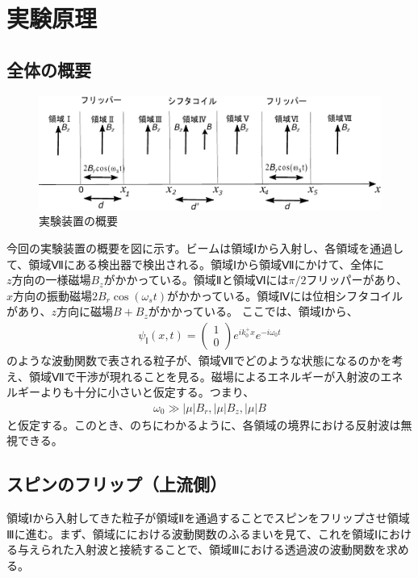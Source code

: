\section{実験原理}
\subsection{全体の概要}
\begin{figure}[h]
\begin{center}
\includegraphics[width=13cm]{pi2flipper/zenntaizu.pdf}
\caption{実験装置の概要}
\end{center}
\end{figure}
今回の実験装置の概要を図に示す。ビームは領域Ⅰから入射し、各領域を通過して、領域Ⅶにある検出器で検出される。領域Ⅰから領域Ⅶにかけて、全体に$z方向の一様磁場B_{z}$がかかっている。領域Ⅱと領域Ⅵには$\pi/2フリッパー$があり、$x方向の振動磁場2B_{r}\cos(\omega_{s}t)$がかかっている。領域Ⅳには位相シフタコイルがあり、$z方向に磁場B+B_{z}$がかかっている。
ここでは、領域Ⅰから、
\begin{align}
{\psi}_{Ⅰ}(x,t)=
\begin{pmatrix}
1 \\
0
\end{pmatrix}
e^{ik_{0}^{+}x}e^{-i\omega_{0}t}
\end{align}
のような波動関数で表される粒子が、領域Ⅶでどのような状態になるのかを考え、領域Ⅶで干渉が現れることを見る。磁場によるエネルギーが入射波のエネルギーよりも十分に小さいと仮定する。つまり、
\begin{align}
\omega_{0} \gg |{\mu}|B_{r},  |{\mu}|B_{z},  |{\mu}|B
\end{align}
と仮定する。このとき、のちにわかるように、各領域の境界における反射波は無視できる。
\subsection{スピンのフリップ（上流側）}
領域Ⅰから入射してきた粒子が領域Ⅱを通過することでスピンをフリップさせ領域Ⅲに進む。まず、領域ににおける波動関数のふるまいを見て、これを領域Ⅰにおける与えられた入射波と接続することで、領域Ⅲにおける透過波の波動関数を求める。
